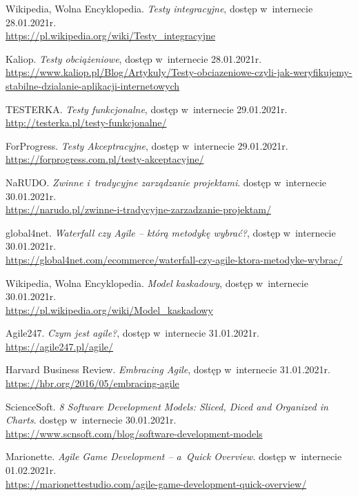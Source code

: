 \documentclass[oneside,polski,logo]{amuthesis}
\begin{document}
\begin{thebibliography}{100}
Wikipedia, Wolna Encyklopedia. \emph{Testy integracyjne}, dostęp w~internecie 28.01.2021r.\\
\url{https://pl.wikipedia.org/wiki/Testy\_integracyjne}

Kaliop. \emph{Testy obciążeniowe}, dostęp w~internecie 28.01.2021r.\\
\url{https://www.kaliop.pl/Blog/Artykuly/Testy-obciazeniowe-czyli-jak-weryfikujemy-stabilne-dzialanie-aplikacji-internetowych}

TESTERKA. \emph{Testy funkcjonalne}, dostęp w~internecie 29.01.2021r.\\
\url{http://testerka.pl/testy-funkcjonalne/}

ForProgress. \emph{Testy Akceptracyjne}, dostęp w~internecie 29.01.2021r.\\
\url{https://forprogress.com.pl/testy-akceptacyjne/}

NaRUDO. \emph{Zwinne i~tradycyjne zarządzanie projektami}. dostęp w~internecie 30.01.2021r.\\
\url{https://narudo.pl/zwinne-i-tradycyjne-zarzadzanie-projektam/}

global4net. \emph{Waterfall czy Agile – którą metodykę wybrać?}, dostęp w~internecie 30.01.2021r.\\
 \url{https://global4net.com/ecommerce/waterfall-czy-agile-ktora-metodyke-wybrac/}

Wikipedia, Wolna Encyklopedia. \emph{Model kaskadowy}, dostęp w~internecie 30.01.2021r.\\
\url{https://pl.wikipedia.org/wiki/Model\_kaskadowy}

Agile247. \emph{Czym jest agile?}, dostęp w~internecie 31.01.2021r.\\
\url{https://agile247.pl/agile/}

Harvard Business Review. \emph{Embracing Agile}, dostęp w~internecie 31.01.2021r.\\
\url{https://hbr.org/2016/05/embracing-agile}

ScienceSoft. \emph{8 Software Development Models: Sliced, Diced and Organized in Charts}.  dostęp w~internecie 30.01.2021r.\\
\url{https://www.scnsoft.com/blog/software-development-models}

Marionette. \emph{Agile Game Development – a~Quick Overview}. dostęp w~internecie 01.02.2021r.\\
\url{https://marionettestudio.com/agile-game-development-quick-overview/}


\end{thebibliography}
\end{document}
